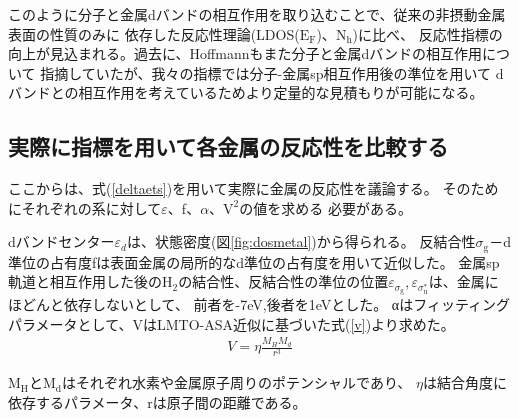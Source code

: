 \documentclass[12pt]{ltjsarticle}
\begin{document}
このように分子と金属dバンドの相互作用を取り込むことで、従来の非摂動金属表面の性質のみに
依存した反応性理論(LDOS($\text{E}_\text{F}$)、$\text{N}_\text{h}$)に比べ、
反応性指標の向上が見込まれる。過去に、Hoffmannもまた分子と金属dバンドの相互作用について
指摘していた\cite{Hoffman1988}が、我々の指標では分子-金属sp相互作用後の準位を用いて
dバンドとの相互作用を考えているためより定量的な見積もりが可能になる。

\subsection{実際に指標を用いて各金属の反応性を比較する}
ここからは、式(\ref{deltaets})を用いて実際に金属の反応性を議論する。
そのためにそれぞれの系に対して$\varepsilon$、f、$\alpha$、$\text{V}^\text{2}$の値を求める
必要がある。

dバンドセンター$\varepsilon_d$は、状態密度(図\ref{fig:dosmetal})から得られる。
反結合性$\sigma_\text{g}$－d準位の占有度fは表面金属の局所的なd準位の占有度を用いて近似した。
金属sp軌道と相互作用した後の$\text{H}_\text{2}$の結合性、反結合性の準位の位置$\varepsilon _
{\sigma_\text{g}},\varepsilon _{\sigma_\text{u}^*}$は、金属にほどんと依存しないとして、
前者を-7eV,後者を1eVとした。
αはフィッティングパラメータとして、VはLMTO-ASA近似に基づいた式(\ref{v})より求めた。
\cite{Norskov1989}
\begin{eqnarray}
    \label{v}
    V = \eta \frac{ M_H M_d }{r^3}
\end{eqnarray}

$\text{M}_\text{H}$と$\text{M}_\text{d}$はそれぞれ水素や金属原子周りのポテンシャルであり、
$\eta$は結合角度に依存するパラメータ、rは原子間の距離である。
\end{document}
